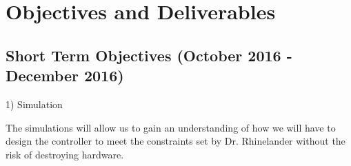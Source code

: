 \section{Objectives and Deliverables}
\subsection{Short Term Objectives (October 2016 - December 2016)}
1) Simulation

	The simulations will allow us to gain an understanding of how we will have to design the controller to meet the constraints set by Dr. Rhinelander without the risk of destroying hardware.
	
